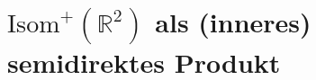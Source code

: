 \documentclass[a4paper, ngerman]{article}
\newcounter{chapter}
\numberwithin{equation}{chapter}
\theoremstyle{plain}
\newtheorem{corollarystrd}{Korollar(*)}[chapter]
\newtheorem{propositionstrd}{Proposition(*)}[chapter]
\theoremstyle{definition}
\newcommand{\geradisometr}{\ensuremath{\mathrm{Isom}^+(\mathbb R^2)}}
\newcommand{\anm}[1]{{\color{red} #1}}
\begin{document}

\section{\(\geradisometr\) als (inneres) semidirektes Produkt}
\end{document}

